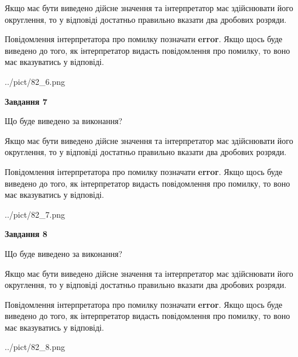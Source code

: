\documentclass[12pt, ukrainian]{article}
\begin{document}
{\begin {Large}
Якщо має бути виведено дійсне значення та інтерпретатор має здійснювати його округлення, 
то у відповіді достатньо правильно вказати два дробових розряди.

Повідомлення інтерпретатора про помилку позначати \textbf{error}.
Якщо щось буде виведено до того, як інтерпретатор видасть повідомлення про помилку, 
то воно має вказуватись у відповіді. \par

\begin{center}
	{../pict/82_6.png}
\end{center}
\newpage

{\begin {center}\textbf{Завдання 7}\end {center}}\par
Що буде виведено за виконання? \par

Якщо має бути виведено дійсне значення та інтерпретатор має здійснювати його округлення, 
то у відповіді достатньо правильно вказати два дробових розряди.

Повідомлення інтерпретатора про помилку позначати \textbf{error}.
Якщо щось буде виведено до того, як інтерпретатор видасть повідомлення про помилку, 
то воно має вказуватись у відповіді. \par

\begin{center}
	{../pict/82_7.png}
\end{center}
\newpage

{\begin {center}\textbf{Завдання 8}\end {center}}\par
Що буде виведено за виконання? \par

Якщо має бути виведено дійсне значення та інтерпретатор має здійснювати його округлення, 
то у відповіді достатньо правильно вказати два дробових розряди.

Повідомлення інтерпретатора про помилку позначати \textbf{error}.
Якщо щось буде виведено до того, як інтерпретатор видасть повідомлення про помилку, 
то воно має вказуватись у відповіді. \par

\begin{center}
	{../pict/82_8.png}
\end{center}
\newpage


\end{Large}}
\end{document}
